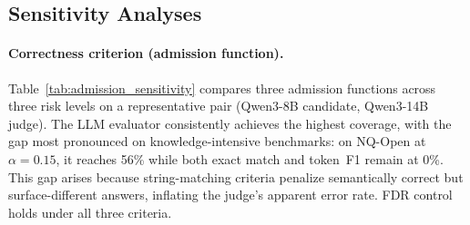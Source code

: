 \subsection{Sensitivity Analyses}
\label{sec:sensitivity}
\label{app:calibsens}

\paragraph{Correctness criterion (admission function).}
Table~\ref{tab:admission_sensitivity} compares three admission functions across three risk levels on a representative pair (Qwen3-8B candidate, Qwen3-14B judge). The LLM evaluator consistently achieves the highest coverage, with the gap most pronounced on knowledge-intensive benchmarks: on NQ-Open at $\alpha\!=\!0.15$, it reaches 56\% while both exact match and token~F1 remain at 0\%. This gap arises because string-matching criteria penalize semantically correct but surface-different answers, inflating the judge's apparent error rate. FDR control holds under all three criteria.

\begin{table}[h]
\centering
\caption{Sensitivity to admission function. Candidate: Qwen3-8B, Judge: Qwen3-14B, UQ: PE (white-box). FDR and coverage at $\alpha \in \{.15, .20, .25\}$.}
\label{tab:admission_sensitivity}
\end{table}

